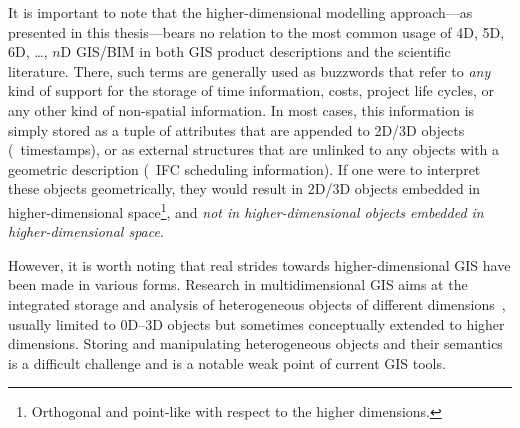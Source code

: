 
It is important to note that the higher-dimensional modelling approach---as presented in this thesis---bears no relation to the most common usage of 4D, 5D, 6D, \ldots, $n$D GIS/BIM in both GIS product descriptions and the scientific literature.
There, such terms are generally used as buzzwords that refer to \emph{any} kind of support for the storage of time information, costs, project life cycles, or any other kind of non-spatial information.
In most cases, this information is simply stored as a tuple of attributes that are appended to 2D/3D objects (\eg\ timestamps), or as external structures that are unlinked to any objects with a geometric description (\eg\ IFC scheduling information).
If one were to interpret these objects geometrically, they would result in 2D/3D objects embedded in higher-dimensional space\footnote{Orthogonal and point-like with respect to the higher dimensions.}, and \emph{not in higher-dimensional objects embedded in higher-dimensional space}.


However, it is worth noting that real strides towards higher-dimensional GIS have been made in various forms.
Research in multidimensional GIS aims at the integrated storage and analysis of heterogeneous objects of different dimensions~\citep{Raper00,Gold05}, usually limited to 0D--3D objects but sometimes conceptually extended to higher dimensions.
Storing and manipulating heterogeneous objects and their semantics is a difficult challenge and is a notable weak point of current GIS tools.


